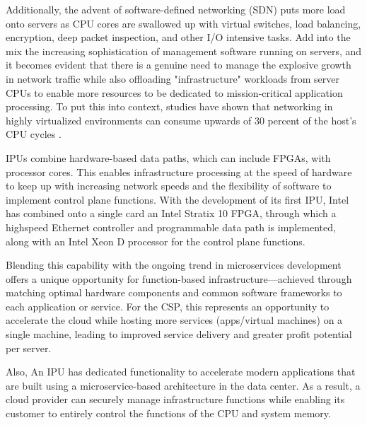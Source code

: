 \documentclass[../sn.tex]{subfiles}
\begin{document}
Additionally, the advent of software-defined networking (SDN) puts more load onto servers as CPU cores are swallowed up with virtual switches, load balancing, encryption, deep packet inspection, and other I/O intensive tasks.
Add into the mix the increasing sophistication of management software running on servers, and it becomes evident that there is a genuine need to manage the explosive growth in network traffic while also offloading "infrastructure" workloads from server CPUs to enable more resources to be dedicated to mission-critical application processing.
To put this into context, studies have shown that networking in highly virtualized environments can consume upwards of 30 percent of the host's CPU cycles \cite{evaleng}.

IPUs combine hardware-based data paths, which can include FPGAs, with processor cores.
This enables infrastructure processing at the speed of hardware to keep up with increasing network speeds and the flexibility of software to implement control plane functions.
With the development of its first IPU, Intel has combined onto a single card an Intel Stratix 10 FPGA, through which a highspeed Ethernet controller and programmable data path is implemented, along with an Intel Xeon D processor for the control plane functions.

Blending this capability with the ongoing trend in microservices development offers a unique opportunity for function-based infrastructure—achieved through matching optimal hardware components and common software frameworks to each application or service.
For the CSP, this represents an opportunity to accelerate the cloud while hosting more services (apps/virtual machines) on a single machine, leading to improved service delivery and greater profit potential per server.

Also, An IPU has dedicated functionality to accelerate modern applications that are built using a microservice-based architecture in the data center.
As a result, a cloud provider can securely manage infrastructure functions while enabling its customer to entirely control the functions of the CPU and system memory. 
\end{document}
